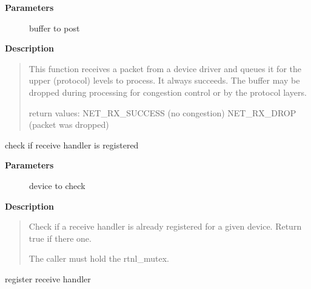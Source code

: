 \documentclass[a4paper,8pt,english]{sphinxmanual}
\begin{document}
\textbf{Parameters}
\begin{description}
\item[{}] \leavevmode
buffer to post

\end{description}

\textbf{Description}
\begin{quote}

This function receives a packet from a device driver and queues it for
the upper (protocol) levels to process.  It always succeeds. The buffer
may be dropped during processing for congestion control or by the
protocol layers.

return values:
NET\_RX\_SUCCESS  (no congestion)
NET\_RX\_DROP     (packet was dropped)
\end{quote}

\begin{fulllineitems}
\label{networking/kapi:c.netdev_is_rx_handler_busy}
check if receive handler is registered

\end{fulllineitems}


\textbf{Parameters}
\begin{description}
\item[{}] \leavevmode
device to check

\end{description}

\textbf{Description}
\begin{quote}

Check if a receive handler is already registered for a given device.
Return true if there one.

The caller must hold the rtnl\_mutex.
\end{quote}

\begin{fulllineitems}
\label{networking/kapi:c.netdev_rx_handler_register}
register receive handler

\end{fulllineitems}
\end{document}
